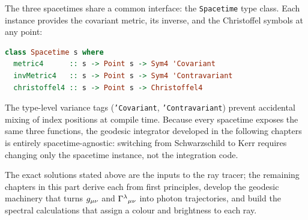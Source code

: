 The three spacetimes share a common interface: the
\texttt{Spacetime} type class.  Each instance provides the covariant
metric, its inverse, and the Christoffel symbols at any point:
%
\begin{lstlisting}[language=Haskell]
class Spacetime s where
  metric4      :: s -> Point s -> Sym4 'Covariant
  invMetric4   :: s -> Point s -> Sym4 'Contravariant
  christoffel4 :: s -> Point s -> Christoffel4
\end{lstlisting}
%
The type-level variance tags (\texttt{'Covariant},
\texttt{'Contravariant}) prevent accidental mixing of index positions
at compile time.  Because every spacetime exposes the same three
functions, the geodesic integrator developed in the following chapters
is entirely spacetime-agnostic: switching from Schwarzschild to Kerr
requires changing only the spacetime instance, not the integration
code.

The exact solutions stated above are the inputs to the ray tracer;
the remaining chapters in this part derive each from first principles,
develop the geodesic machinery that turns $g_{\mu\nu}$ and
$\Gamma^{\lambda}{}_{\mu \nu}$ into photon trajectories, and build
the spectral calculations that assign a colour and brightness to each
ray.
